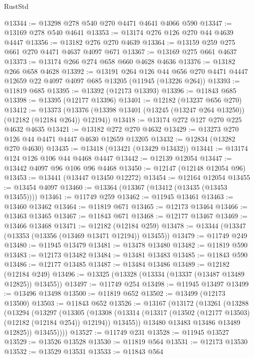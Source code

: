 \begin{lexlean}{RustStd}
\begin{coremodule}
@13344 := @13298 @278 @540 @270 @4471 @4641 @4066 @590
@13347 := @13169 @278 @540 @4641
@13353 := @13174 @276 @126 @270 @44 @4639 @4447
@13356 := @13182 @276 @270 @4639
@13364 := @13159 @259 @275 @661 @270 @4471 @4637 @4097 @671
@13367 := @13169 @275 @661 @4637
@13373 := @13174 @266 @274 @658 @660 @4628 @4636
@13376 := @13182 @266 @658 @4628
@13392 := @13191
    @264
    @126
    @44
    @656
    @270
    @4471
    @4447
    @12659
    @22
    @4097
    @4097
    @685
    @13205
    (@11945 (@13226 @264))
@13393 := @11819 @685
@13395 := @13392 (@12173 @13393)
@13396 := @11843 @685
@13398 := @13395 (@12177 @13396)
@13401 := @12182 (@13237 @656 @270)
@13412 := @13373
    (@13376 (@13398 @13401 (@13245 (@13247 @264 @13250)) (@12182 (@12184 @264)) @12194))
@13418 := @13174 @272 @127 @270 @225 @4632 @4635
@13421 := @13182 @272 @270 @4632
@13429 := @13273 @270 @126 @44 @4471 @4447 @4630 @12659 @13205
@13432 := @12834 (@13282 @270 @4630)
@13435 := @13418 (@13421 (@13429 @13432))
@13441 := @13174 @124 @126 @106 @44 @4468 @4447
@13442 := @12139 @12054
@13447 := @13442 @4097 @96 @106 @96 @4468
@13450 := @12147 (@12148 @12054 @96)
@13453 := @13441 (@13447 @13450 @12272)
@13454 := @12164 @12054
@13455 := @13454 @4097
@13460 := @13364 (@13367 (@13412 (@13435 (@13453 @13455))))
@13461 := @11749 @259
@13462 := @11945 @13461
@13463 := @13460 @13462
@13464 := @11819 @671
@13465 := @12173 @13464
@13466 := @13463 @13465
@13467 := @11843 @671
@13468 := @12177 @13467
@13469 := @13466 @13468
@13471 := @12182 (@12184 @259)
@13478 := @13344 (@13347 (@13353 (@13356 (@13469 @13471 @12194)) @13455))
@13479 := @11749 @249
@13480 := @11945 @13479
@13481 := @13478 @13480
@13482 := @11819 @590
@13483 := @12173 @13482
@13484 := @13481 @13483
@13485 := @11843 @590
@13486 := @12177 @13485
@13487 := @13484 @13486
@13489 := @12182 (@12184 @249)
@13496 := @13325 (@13328 (@13334 (@13337 (@13487 @13489 @12825)) @13455))
@13497 := @11749 @254
@13498 := @11945 @13497
@13499 := @13496 @13498
@13500 := @11819 @652
@13502 := @13499 (@12173 @13500)
@13503 := @11843 @652
@13526 := @13167
    (@13172
      (@13261
        (@13288
          (@13294
            (@13297
              (@13305
                (@13308
                  (@13314 (@13317 (@13502 (@12177 @13503) (@12182 (@12184 @254)) @12194)) @13455))
                @13480
                @13483
                @13486
                @13489
                @12825))
            @13455))))
@13527 := @11749 @231
@13528 := @11945 @13527
@13529 := @13526 @13528
@13530 := @11819 @564
@13531 := @12173 @13530
@13532 := @13529 @13531
@13533 := @11843 @564

\end{coremodule}
\end{lexlean}

